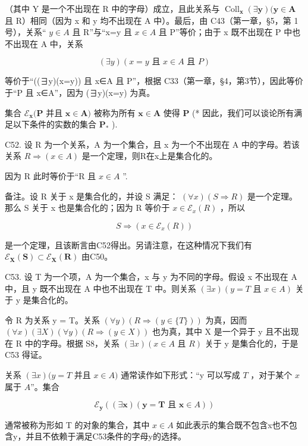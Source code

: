 （其中 Y 是一个不出现在 R 中的字母）成立，且此关系与 \(\operatorname{Coll}_{\mathbf{x}}(\exists\mathbf{y})(\mathbf{y}\in\mathbf{A}\) 且 R）相同（因为 x 和 y 均不出现在 A 中）。最后，由 C43（第一章，§5，第 1 号），关系“ \(y\in A\) 且 R”与“x=y 且 \(x\in A\) 且 P”等价；由于 x 既不出现在 P 中也不出现在 A 中，关系

\[
(\exists y) (x = y \text {   且   } x \in A \text {   且   } P)
\]

等价于“((∃y)(x=y)) 且 x∈A 且 P”，根据 C33（第一章，§4，第3节），因此等价于“P 且 x∈A”，因为 (∃y)(x=y) 为真。

集合 \(\mathcal{E}_{\pmb{x}}(\pmb{P}\) 并且 \(\pmb{x} \in \pmb{A})\) 被称为所有 \(\pmb{x} \in \pmb{A}\) 使得 \(\pmb{P}\) (* 因此，我们可以谈论所有满足以下条件的实数的集合 \(\pmb{P}_{*}\) ).

C52. 设 R 为一个关系，A 为一个集合，且 x 为一个不出现在 A 中的字母。若该关系 \(R \Longrightarrow (x \in A)\) 是一个定理，则R在x上是集合化的。

因为 R 此时等价于“R 且 \(x \in A\) ''.

备注。设 R 关于 x 是集合化的，并设 S 满足： \((\forall x)(S \Longrightarrow R)\) 是一个定理。那么 S 关于 x 也是集合化的；因为 R 等价于 \(x \in \mathcal{E}_{x}(R)\) ，所以

\[
S \Longrightarrow (x \in \mathcal {E} _ {x} (R))
\]

是一个定理，且该断言由C52得出。另请注意，在这种情况下我们有 \(\mathcal{E}_{\pmb{X}}(\pmb{S}) \subset \mathcal{E}_{\pmb{X}}(\pmb{R})\) 由C50。

C53. 设 T 为一个项，A 为一个集合，x 与 y 为不同的字母。假设 x 不出现在 A 中，且 y 既不出现在 A 中也不出现在 T 中。则关系 \((\exists x)(y = T \text{ 且 } x \in A)\) 关于 y 是集合化的。

令 R 为关系 y = T。关系 \((\forall y)(R \Longrightarrow (y \in \{T\}))\) 为真，因而 \((\forall x)(\exists X)(\forall y)(R \Longrightarrow (y \in X))\) 也为真，其中 X 是一个异于 y 且不出现在 R 中的字母。根据 S8，关系 \((\exists x)(x \in A \text{ 且 } R)\) 关于 y 是集合化的，于是 C53 得证。

关系 \((\exists x)(y = T\) 并且 \(x \in A)\) 通常读作如下形式：“y 可以写成 \(T\) ，对于某个 \(x\) 属于 \(A\)''。集合

\[
\mathcal {E} _ {\boldsymbol {y}} ((\exists \boldsymbol {x}) (\boldsymbol {y} = \boldsymbol {T} \text {   且   } \boldsymbol {x} \in A))
\]

通常被称为形如 T 的对象的集合，其中 \(x \in A\) 如此表示的集合既不包含x也不包含y，并且不依赖于满足C53条件的字母y的选择。


